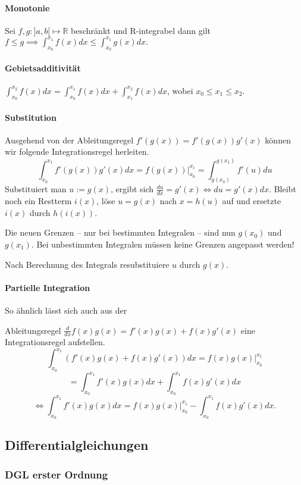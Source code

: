 \documentclass[a4paper, 9pt, DIV=24]{scrartcl}
\begin{document}
\paragraph{Monotonie}
Sei $f,g : ]a,b[ \mapsto \mathbb{R}$ beschränkt und R-integrabel dann gilt
$ f \leq g \implies \int_{x_0}^{x_1}f(x)dx \leq \int_{x_0}^{x_1}g(x)dx. $
\paragraph{Gebietsadditivität}
$\int_{x_0}^{x_2}f(x)dx = \int_{x_0}^{x_1}f(x)dx + \int_{x_1}^{x_2}f(x)dx$, wobei $x_0 \leq x_1 \leq x_2$.

\paragraph{Substitution}
Ausgehend von der Ableitungsregel $f'(g(x)) = f'(g(x))g'(x)$ können wir folgende Integrationsregel herleiten.
\[ \int_{x_0}^{x_1}f'(g(x))g'(x)dx = f(g(x))|_{x_0}^{x_1} = \int_{g(x_0)}^{g(x_1)}f'(u)du \]
Substituiert man $u := g(x)$, ergibt sich $\frac{du}{dx} = g'(x) \iff du = g'(x)dx$.
Bleibt noch ein Restterm $i(x)$, löse $u = g(x)$ nach $x = h(u)$ auf und ersetzte $i(x)$ durch $h(i(x))$.

Die neuen Grenzen -- nur bei bestimmten Integralen -- sind nun $g(x_0)$ und $g(x_1)$.
Bei unbestimmten Integralen müssen keine Grenzen angepasst werden!

Nach Berechnung des Integrals resubstituiere $u$ durch $g(x)$.

\paragraph{Partielle Integration}
So ähnlich lässt sich auch aus der

Ableitungsregel $\frac{d}{dx}f(x)g(x) = f'(x)g(x) + f(x)g'(x)$ eine Integrationsregel aufstellen.
\[ \int_{x_0}^{x_1}(f'(x)g(x)+f(x)g'(x))dx = f(x)g(x)|_{x_0}^{x_1} \]
\[ = \int_{x_0}^{x_1}f'(x)g(x)dx + \int_{x_0}^{x_1}f(x)g'(x)dx \]
\[ \iff \int_{x_0}^{x_1}f'(x)g(x)dx = f(x)g(x)|_{x_0}^{x_1} - \int_{x_0}^{x_1}f(x)g'(x)dx. \]

\subsection{Differentialgleichungen}

\subsubsection{DGL erster Ordnung}
\end{document}
